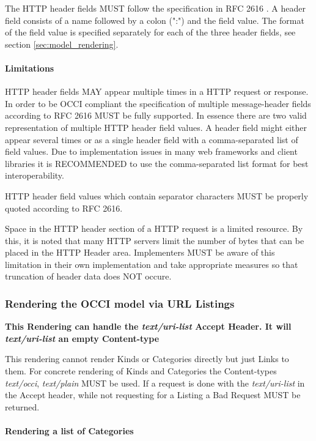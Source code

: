 \documentclass[10pt,a4paper]{article}
\begin{document}
The HTTP header fields MUST follow the specification in RFC 2616
\cite{rfc2616}. A header field consists of a name followed by a colon
(":") and the field value. The format of the field value is specified
separately for each of the three header fields, see section
\ref{sec:model_rendering}.

\paragraph{Limitations}
HTTP header fields MAY appear multiple times in a HTTP request or
response. In order to be OCCI compliant the specification of multiple
message-header fields according to RFC 2616 MUST be fully
supported. In essence there are two valid representation of multiple
HTTP header field values. A header field might either appear several
times or as a single header field with a comma-separated list of field
values. Due to implementation issues in many web frameworks and client
libraries it is RECOMMENDED to use the comma-separated list format for
best interoperability.

HTTP header field values which contain separator characters MUST be
properly quoted according to RFC 2616.

Space in the HTTP header section of a HTTP request is a limited
resource. By this, it is noted that many HTTP servers limit the number
of bytes that can be placed in the HTTP Header area. Implementers MUST
be aware of this limitation in their own implementation and take
appropriate measures so that truncation of header data does NOT
occure.

\subsubsection{Rendering the OCCI model via URL Listings}

\textbf{This Rendering can handle the \textit{text/uri-list} Accept
  Header. It will \textit{text/uri-list} an empty Content-type}

This rendering cannot render Kinds or Categories directly but just
Links to them. For concrete rendering of Kinds and Categories the
Content-types \textit{text/occi}, \textit{text/plain} MUST be used. If
a request is done with the \textit{text/uri-list} in the Accept
header, while not requesting for a Listing a Bad Request MUST be
returned.

\paragraph{Rendering a list of Categories}
\end{document}
